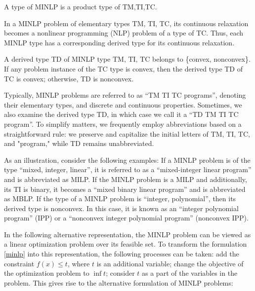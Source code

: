 \begin{definition}
A type of MINLP is a product type of TM,TI,TC.
\end{definition}



In a MINLP problem of elementary types TM, TI, TC, its continuous relaxation becomes a nonlinear programming (NLP) problem of a type of TC. Thus, each MINLP type has a corresponding derived type for its continuous relaxation.

\begin{definition}
    A derived type TD of MINLP type TM, TI, TC belongs to \{convex, nonconvex\}. If any problem instance of the TC type  is convex, then the derived type TD of TC is convex; otherwise, TD is nonconvex.
\end{definition}

Typically, MINLP problems are referred to as ``TM TI TC programs'', denoting their elementary types, and discrete and continuous properties. Sometimes, we also examine the derived type TD, in which case we call it a ``TD TM TI TC program''. To simplify matters, we frequently employ abbreviations based on a straightforward rule: we preserve and capitalize the initial letters of TM, TI, TC, and "program," while TD remains unabbreviated.

As an illustration, consider the following examples:
 If a MINLP problem is of the type ``mixed, integer, linear'', it is referred to as a ``mixed-integer linear program'' and is abbreviated as MILP. If the MINLP problem is a MILP and additionally, its TI is binary, it becomes a ``mixed binary linear program'' and is abbreviated as MBLP.  If the type of a MINLP problem is ``integer, polynomial'', then its derived type is nonconvex. In this case, it is known as an ``integer polynomial program'' (IPP) or a ``nonconvex integer polynomial program'' (nonconvex IPP).







In the following alternative representation, the MINLP problem can be viewed as a linear optimization problem over its feasible set. To transform the formulation \eqref{minlp} into  this representation, the following processes can be taken: add the constraint $f(x) \le t$, where $t$ is an additional variable; change the objective of the optimization problem to $\inf t$;
consider $t$ as a part of the variables in the problem.
This gives rise to the alternative formulation of MINLP problems:

